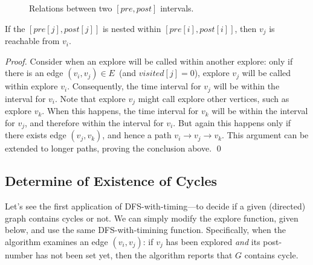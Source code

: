 \begin{figure}[h!]
\centering{}
\caption{Relations between two $[pre,post]$ intervals.}
\label{fig:interval}
\end{figure}

\begin{claim}
If the $[pre[j], post[j]]$ is nested within $[pre[i], post[i]]$, then $v_j$ is reachable from $v_i$.
\label{claim:path}
\end{claim}

\emph{Proof.} 
Consider when an explore will be called within another explore: 
only if there is an edge $(v_i, v_j)\in E$~(and $visited[j] = 0$), explore $v_j$ will be called within explore $v_i$.
Consequently, the time interval for $v_j$ will be within the interval for $v_i$.
Note that explore $v_j$ might call explore other vertices, such as explore $v_k$.
When this happens, the time interval for $v_k$ will be within the interval for $v_j$, and therefore within
the interval for $v_i$.  
But again this happens only if there exists edge $(v_j, v_k)$, and hence a path $v_i \to v_j \to v_k$.
This argument can be extended to longer paths, proving the conclusion above. \qed


\subsection*{Determine of Existence of Cycles}

Let's see the first application of DFS-with-timing---to decide if a given (directed) graph contains cycles or not.
We can simply modify the explore function, given below, and use the same DFS-with-timining function.
Specifically, when the algorithm examines an edge $(v_i, v_j)$:
if $v_j$ has been explored \emph{and} its post-number has not been set yet,
then the algorithm reports that $G$ contains cycle.


